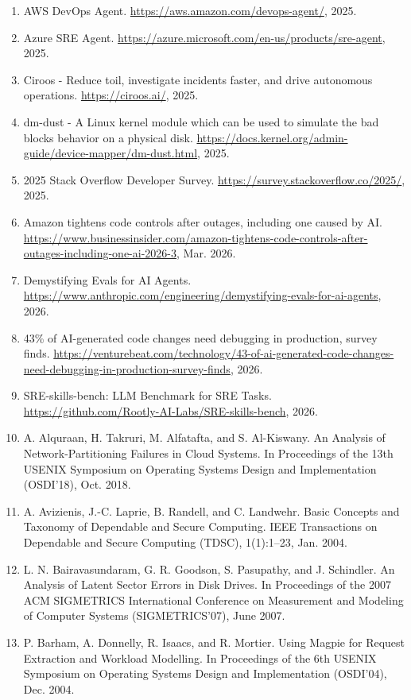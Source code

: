 \documentclass[11pt,UTF8,fontset=fandol]{ctexart}
\begin{document}
\begin{enumerate}[leftmargin=2.2em,labelsep=0.4em,itemsep=0.15em]
\item AWS DevOps Agent. \url{https://aws.amazon.com/devops-agent/}, 2025.
\item Azure SRE Agent. \url{https://azure.microsoft.com/en-us/products/sre-agent}, 2025.
\item Ciroos - Reduce toil, investigate incidents faster, and drive autonomous operations. \url{https://ciroos.ai/}, 2025.
\item dm-dust - A Linux kernel module which can be used to simulate the bad blocks behavior on a physical disk. \url{https://docs.kernel.org/admin-guide/device-mapper/dm-dust.html}, 2025.
\item 2025 Stack Overflow Developer Survey. \url{https://survey.stackoverflow.co/2025/}, 2025.
\item Amazon tightens code controls after outages, including one caused by AI. \url{https://www.businessinsider.com/amazon-tightens-code-controls-after-outages-including-one-ai-2026-3}, Mar. 2026.
\item Demystifying Evals for AI Agents. \url{https://www.anthropic.com/engineering/demystifying-evals-for-ai-agents}, 2026.
\item 43\% of AI-generated code changes need debugging in production, survey finds. \url{https://venturebeat.com/technology/43-of-ai-generated-code-changes-need-debugging-in-production-survey-finds}, 2026.
\item SRE-skills-bench: LLM Benchmark for SRE Tasks. \url{https://github.com/Rootly-AI-Labs/SRE-skills-bench}, 2026.
\item A. Alquraan, H. Takruri, M. Alfatafta, and S. Al-Kiswany. An Analysis of Network-Partitioning Failures in Cloud Systems. In Proceedings of the 13th USENIX Symposium on Operating Systems Design and Implementation (OSDI'18), Oct. 2018.
\item A. Avizienis, J.-C. Laprie, B. Randell, and C. Landwehr. Basic Concepts and Taxonomy of Dependable and Secure Computing. IEEE Transactions on Dependable and Secure Computing (TDSC), 1(1):1--23, Jan. 2004.
\item L. N. Bairavasundaram, G. R. Goodson, S. Pasupathy, and J. Schindler. An Analysis of Latent Sector Errors in Disk Drives. In Proceedings of the 2007 ACM SIGMETRICS International Conference on Measurement and Modeling of Computer Systems (SIGMETRICS'07), June 2007.
\item P. Barham, A. Donnelly, R. Isaacs, and R. Mortier. Using Magpie for Request Extraction and Workload Modelling. In Proceedings of the 6th USENIX Symposium on Operating Systems Design and Implementation (OSDI'04), Dec. 2004.

\end{enumerate}
\end{document}

